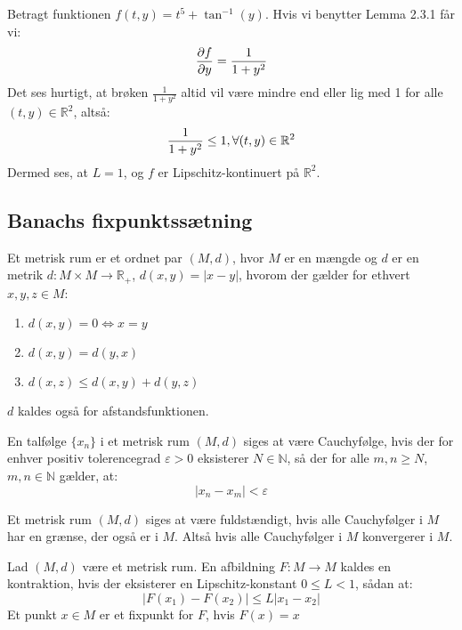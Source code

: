 \begin{Example}\hfill \break
\textnormal{Betragt funktionen $f(t,y)=t^5+\tan^{-1}(y)$. Hvis vi benytter Lemma 2.3.1 får vi:} \hfill \break
\begin{align}
\frac{\partial f}{\partial y}=\frac{1}{1+y^2} \notag
\end{align}
\textnormal{Det ses hurtigt, at brøken $\frac{1}{1+y^2}$ altid vil være mindre end eller lig med 1 for alle $(t,y)\in \mathbb{R}^2$, altså:}
\begin{align}
 \frac{1}{1+y^2}\leq 1, \forall(t,y) \in \mathbb{R}^2 \notag
\end{align}
\textnormal{Dermed ses, at $L=1$, og $f$ er Lipschitz-kontinuert på $\mathbb{R}^2$.}
\end{Example}

\subsection{Banachs fixpunktssætning}

\begin{definition}
Et metrisk rum er et ordnet par $(M,d)$, hvor $M$ er en mængde og $d$ er en metrik $d:M\times M \rightarrow \mathbb{R}_+$, $d(x,y)=|x-y|$, hvorom der gælder for ethvert $x,y,z \in M$: 
\begin{enumerate}
    \item $d(x,y)=0 \Leftrightarrow x=y$ 
    \item $d(x,y)=d(y,x)$
    \item $d(x,z)\leq d(x,y)+d(y,z)$
\end{enumerate}
$d$ kaldes også for afstandsfunktionen.
\end{definition}

\begin{definition}
En talfølge $\{x_n\}$ i et metrisk rum $(M,d)$ siges at være Cauchyfølge, hvis der for enhver positiv tolerencegrad $\varepsilon >0$ eksisterer $N \in \mathbb{N}$, så der for alle $m,n \geq N$, $m,n \in \mathbb{N}$ gælder, at: 
$$|x_n-x_m|<\varepsilon$$
\end{definition}

\begin{definition}
Et metrisk rum $(M,d)$ siges at være fuldstændigt, hvis alle Cauchyfølger i $M$ har en grænse, der også er i $M$. Altså hvis alle Cauchyfølger i $M$ konvergerer i $M$.
\end{definition}

\begin{definition}
Lad $(M,d)$ være et metrisk rum. En afbildning $F:M\rightarrow M$ kaldes en kontraktion, hvis der eksisterer en Lipschitz-konstant $0 \leq L < 1$, sådan at:
$$|F(x_1)-F(x_2)|\leq L|x_1-x_2|$$
Et punkt $x \in M$ er et fixpunkt for $F$, hvis $F(x)=x$ 
\end{definition}

